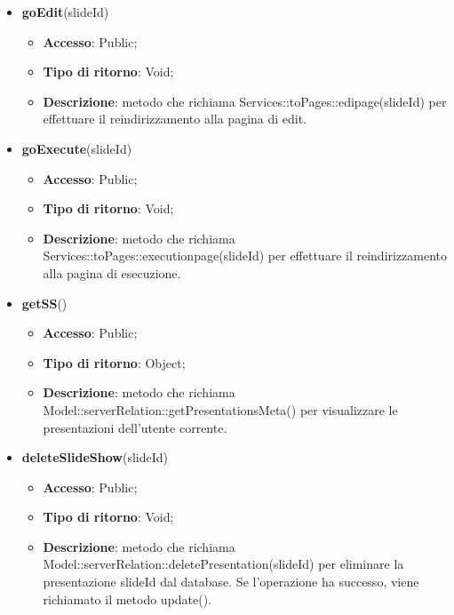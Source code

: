 {{\begin{itemize}
		\begin{itemize}
			\item \textbf{Accesso}: Public;
			\item \textbf{Tipo di ritorno}: Void;
			\item \textbf{Descrizione}: metodo che richiama Services::\-toPages::\-profilepage() per effettuare il reindirizzamento alla pagina profile.
		\end{itemize}
		\item \textbf{goEdit}(slideId)
		\begin{itemize}
			\item \textbf{Accesso}: Public;
			\item \textbf{Tipo di ritorno}: Void;
			\item \textbf{Descrizione}: metodo che richiama Services::\-toPages::\-edipage(slideId) per effettuare il reindirizzamento alla pagina di edit.
		\end{itemize}
		\item \textbf{goExecute}(slideId)
		\begin{itemize}
			\item \textbf{Accesso}: Public;
			\item \textbf{Tipo di ritorno}: Void;
			\item \textbf{Descrizione}: metodo che richiama Services::\-toPages::\-executionpage(slideId) per effettuare il reindirizzamento alla pagina di esecuzione.
		\end{itemize}
		\item \textbf{getSS}()
		\begin{itemize}
			\item \textbf{Accesso}: Public;
			\item \textbf{Tipo di ritorno}: Object;
			\item \textbf{Descrizione}: metodo che richiama Model::\-serverRelation::\-getPresentationsMeta() per visualizzare le presentazioni dell'utente corrente.
		\end{itemize}
		\item \textbf{deleteSlideShow}(slideId)
		\begin{itemize}
			\item \textbf{Accesso}: Public;
			\item \textbf{Tipo di ritorno}: Void;
			\item \textbf{Descrizione}: metodo che richiama Model::\-serverRelation::\-deletePresentation(slideId) per eliminare la presentazione slideId dal database. Se l'operazione ha successo, viene richiamato il metodo update().

\end{itemize}
\end{itemize}}}
